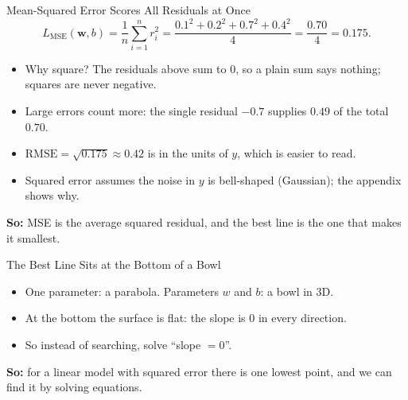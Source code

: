 \documentclass{ntuabeamer}
\newcommand{\takeaway}[1]{\par\vspace{0.3cm}\begingroup\raggedright\noindent
  {\color{courseblue}\textbf{So:}} #1\par\endgroup}
\begin{document}
\begin{frame}{Mean-Squared Error Scores All Residuals at Once}
  \[
    L_{\mathrm{MSE}}(\mathbf w,b)=\frac1n\sum_{i=1}^{n}r_i^2
    =\frac{0.1^2+0.2^2+0.7^2+0.4^2}{4}=\frac{0.70}{4}=0.175 .
  \]
  \begin{itemize}
    \item Why square? The residuals above sum to $0$, so a plain sum says nothing; squares are never negative.
    \item Large errors count more: the single residual $-0.7$ supplies $0.49$ of the total $0.70$.
    \item $\mathrm{RMSE}=\sqrt{0.175}\approx0.42$ is in the units of $y$, which is easier to read.
    \item Squared error assumes the noise in $y$ is bell-shaped (Gaussian); the appendix shows why.
  \end{itemize}
  \takeaway{MSE is the average squared residual, and the best line is the one that makes it smallest.}
\end{frame}

\begin{frame}{The Best Line Sits at the Bottom of a Bowl}
  \centering
  \begin{itemize}
    \item One parameter: a parabola. Parameters $w$ and $b$: a bowl in 3D.
    \item At the bottom the surface is flat: the slope is $0$ in every direction.
    \item So instead of searching, solve ``slope $=0$''.
  \end{itemize}
  \takeaway{for a linear model with squared error there is one lowest point, and we can find it by solving equations.}
\end{frame}
\end{document}
